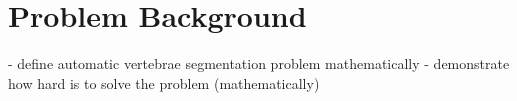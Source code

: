 \chapter{Problem Background}
\label{ch:problem_background}

- define automatic vertebrae segmentation problem mathematically   
- demonstrate how hard is to solve the problem (mathematically)
